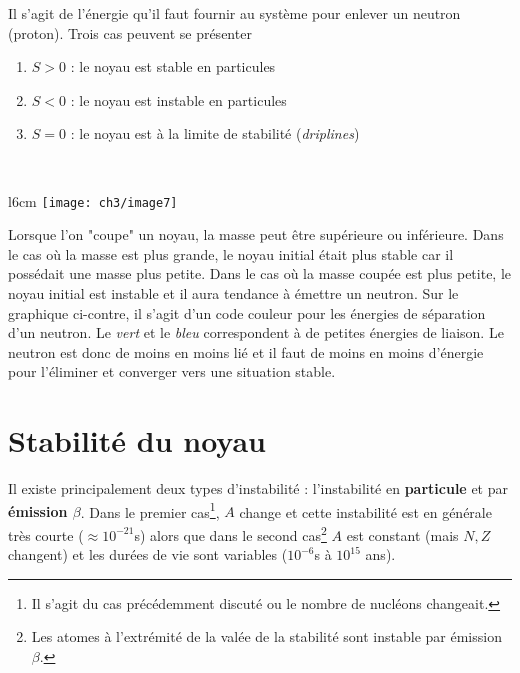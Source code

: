 Il s'agit de l'énergie qu'il faut fournir au système pour enlever un neutron (proton). Trois cas peuvent se
présenter
\begin{enumerate}
\item $S > 0$ : le noyau est stable en particules
\item $S < 0$ : le noyau est instable en particules
\item $S = 0$ : le noyau est à la limite de stabilité (\textit{driplines})
\end{enumerate}\ 

	\begin{wrapfigure}[11]{l}{6cm}
	\texttt{[image: ch3/image7]}
	\end{wrapfigure}

Lorsque l'on "coupe" un noyau, la masse peut être supérieure ou inférieure. Dans le cas où la masse est plus 
grande, le noyau initial était plus stable car il possédait une masse plus petite. Dans le cas où la masse
coupée est plus petite, le noyau initial est instable et il aura tendance à émettre un neutron. Sur le graphique
ci-contre, il s'agit d'un code couleur pour les énergies de séparation d'un neutron. Le \textit{vert} et le
\textit{bleu} correspondent à de petites énergies de liaison. Le neutron est donc de moins en moins lié et il
faut de moins en moins d'énergie pour l’éliminer et converger vers une situation stable.



\section{Stabilité du noyau}
Il existe principalement deux types d'instabilité : l'instabilité en \textbf{particule} et par 
\textbf{émission $\beta$}. Dans le premier cas\footnote{Il s'agit du cas précédemment discuté ou le nombre de
nucléons changeait.}, $A$ change et cette instabilité est en générale très courte ($\approx 10^{-21}$s) alors que
dans le second cas\footnote{Les atomes à l'extrémité de la valée de la stabilité sont instable par émission 
$\beta$.} $A$ est constant (mais $N,Z$ changent) et les durées de vie sont variables ($10^{-6}$s à $10^{15}$ ans).\\

